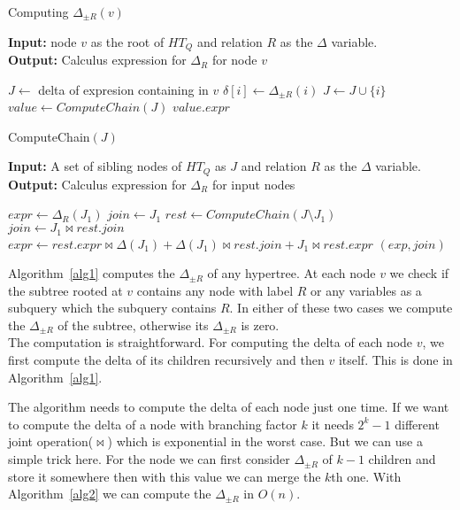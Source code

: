 \documentclass[12pt]{article}
\begin{document}
\begin{algorithm}[H]
\caption{Computing $\Delta_{\pm R}(v)$} 
\label{alg1}
\textbf{Input:} node $v$ as the root of $HT_{Q}$ and relation $R$ as the $\Delta$ variable.\\
\textbf{Output:} Calculus expression for $\Delta_{R}$ for node $v$
\begin{algorithmic}[1]
\STATE $J\gets $ delta of expresion containing in $v$
\STATE $\delta[i]\gets\Delta_{\pm R}(i)$%
\STATE $J\gets J\cup\{i\}$%
\ENDIF
\ENDFOR
\STATE $value\gets ComputeChain(J)$
\RETURN $value.expr$
\end{algorithmic}
\end{algorithm}

\begin{algorithm}[H]
\caption{ComputeChain$(J)$} 
\label{alg2}
\textbf{Input:} A set of sibling nodes of $HT_{Q}$ as $J$ and relation $R$ as the $\Delta$ variable.\\
\textbf{Output:} Calculus expression for $\Delta_{R}$ for input nodes\\
\begin{algorithmic}[1]
\STATE $expr\gets \Delta_{R}(J_{1})$ 
\STATE $join\gets J_{1}$
\ELSE
\STATE $rest\gets ComputeChain(J\setminus J_{1})$
\STATE $join\gets J_{1}\Join rest.join$
\STATE $expr\gets rest.expr\Join \Delta(J_{1})+\Delta(J_{1})\Join rest.join+J_{1}\Join rest.expr$
\ENDIF
\RETURN $(exp,join)$
\end{algorithmic}
\end{algorithm}
Algorithm~\ref{alg1} computes the $\Delta_{\pm R}$ of any hypertree. At each node $v$ we check if the subtree rooted at $v$ contains any node with label $R$ or any variables as a subquery which the subquery contains $R$. In either of these two cases we compute the $\Delta_{\pm R}$ of the subtree, otherwise its $\Delta_{\pm R}$ is zero. \\
The computation is straightforward. For computing the delta of each node $v$, we first compute the delta of its children recursively  and then $v$ itself. This is done in Algorithm~\ref{alg1}. 
\par
The algorithm needs to compute the delta of each node just one time. If we want to compute the delta of a node with branching factor $k$ it needs $2^{k}-1$ different joint operation($\Join$) which is exponential in the worst case. But we can use a simple trick here. For the node we can first consider $\Delta_{\pm R}$ of $k-1$ children and store it somewhere then with this value we can merge the $k$th one. With Algorithm~\ref{alg2} we can compute the $\Delta_{\pm R}$ in $O(n)$.
\end{document}

